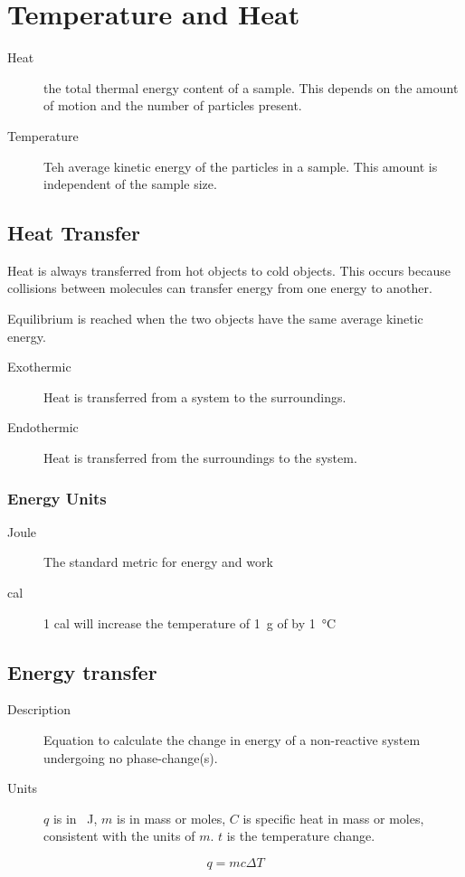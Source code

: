 \section{Temperature and Heat}
\begin{description}
  \item[Heat] the total thermal energy content of a sample. This depends on the
    amount of motion and the number of particles present.
  \item[Temperature] Teh average kinetic energy of the particles in a sample.
    This amount is independent of the sample size.
\end{description}

\subsection{Heat Transfer}
Heat is always transferred from hot objects to cold objects. This occurs because
collisions between molecules can transfer energy from one energy to another.

Equilibrium is reached when the two objects have the same average kinetic
energy.

\begin{description}
  \item[Exothermic] Heat is transferred from a system to the surroundings.
  \item[Endothermic] Heat is transferred from the surroundings to the system.
\end{description}

\subsubsection{Energy Units}
\begin{description}
  \item[Joule] The standard metric for energy and work
  \item[cal] 1 cal will increase the temperature of \SI{1}{\gram} of  by
    \SI{1}{\degreeCelsius}
\end{description}

\subsection{Energy transfer}
\begin{description}
  \item[Description] Equation to calculate the change in energy of a
    non-reactive system undergoing no phase-change(s).
  \item[Units] $q$ is in \SI{}{\joule}, $m$ is in mass or moles, $C$ is specific
    heat in mass or moles, consistent with the units of $m$. $t$ is the
    temperature change.
\end{description}
\begin{equation}
  q=mc\Delta T
\end{equation}

